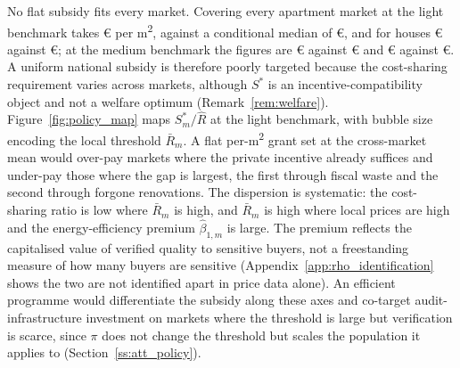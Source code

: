 No flat subsidy fits every market. Covering every apartment market at the light benchmark takes \euro{}\attBaseSMaxTwoFiftyApt{} per m\textsuperscript{2}, against a conditional median of \euro{}\attBaseSMedTwoFiftyApt{}, and for houses \euro{}\attBaseSMaxTwoFiftyHouse{} against \euro{}\attBaseSMedTwoFiftyHouse{}; at the medium benchmark the figures are \euro{}\attBaseSMaxFiveHundredApt{} against \euro{}\attBaseSMedFiveHundredApt{} and \euro{}\attBaseSMaxFiveHundredHouse{} against \euro{}\attBaseSMedFiveHundredHouse{}. A uniform national subsidy is therefore poorly targeted because the cost-sharing requirement varies across markets, although $S^*$ is an incentive-compatibility object and not a welfare optimum (Remark~\ref{rem:welfare}). Figure~\ref{fig:policy_map} maps $S^*_m/\hat R$ at the light benchmark, with bubble size encoding the local threshold $\bar R_m$. A flat per-m\textsuperscript{2} grant set at the cross-market mean would over-pay markets where the private incentive already suffices and under-pay those where the gap is largest, the first through fiscal waste and the second through forgone renovations. The dispersion is systematic: the cost-sharing ratio is low where $\bar R_m$ is high, and $\bar R_m$ is high where local prices are high and the energy-efficiency premium $\hat\beta_{1,m}$ is large. The premium reflects the capitalised value of verified quality to sensitive buyers, not a freestanding measure of how many buyers are sensitive (Appendix~\ref{app:rho_identification} shows the two are not identified apart in price data alone). An efficient programme would differentiate the subsidy along these axes and co-target audit-infrastructure investment on markets where the threshold is large but verification is scarce, since $\pi$ does not change the threshold but scales the population it applies to (Section~\ref{ss:att_policy}).
